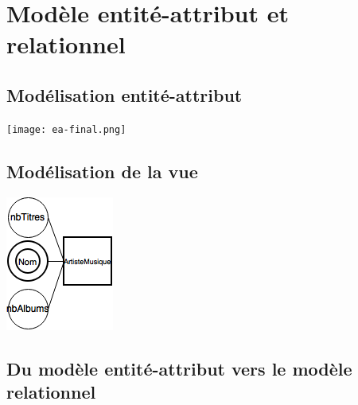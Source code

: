 \documentclass[a4paper,12pt, french]{report}
\begin{document}
\chapter{Modèle entité-attribut et relationnel}
\section{Modélisation entité-attribut}
  \texttt{[image: ea-final.png]}
\section{Modélisation de la vue}
  \includegraphics[scale=0.5]{vues.png}
\section{Du modèle entité-attribut vers le modèle relationnel}
\end{document}
